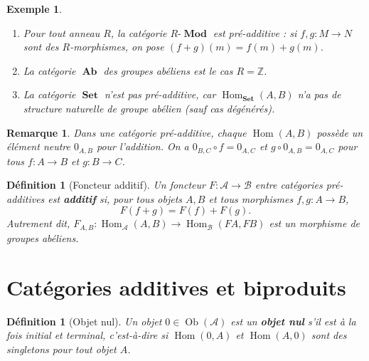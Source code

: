 \documentclass[a4paper,12pt]{book}
\DeclareMathOperator{\Hom}{Hom}
\DeclareMathOperator{\Ob}{Ob}
\DeclareMathOperator{\Set}{\mathbf{Set}}
\DeclareMathOperator{\Ab}{\mathbf{Ab}}
\DeclareMathOperator{\Mod}{\mathbf{Mod}}
\newcommand{\Z}{\mathbb{Z}}
\newtheorem{definition}[theoreme]{Définition}
\newtheorem{exemple}[theoreme]{Exemple}
\newtheorem*{remarque}{Remarque}
\begin{document}
\begin{exemple}\label{ex:preadditive}
\begin{enumerate}[label=(\roman*)]
\item Pour tout anneau $R$, la catégorie $R\text{-}\Mod$\index{R-Mod@$R\text{-}\Mod$}
  est pré-additive : si $f, g \colon M \to N$ sont des $R$-morphismes,
  on pose $(f + g)(m) = f(m) + g(m)$.

\item La catégorie $\Ab$\index{Ab@$\Ab$} des groupes abéliens
  est le cas $R = \Z$.

\item La catégorie $\Set$\index{Set@$\Set$} n'est \emph{pas}
  pré-additive, car $\Hom_{\Set}(A, B)$ n'a pas de structure naturelle
  de groupe abélien (sauf cas dégénérés).
\end{enumerate}
\end{exemple}

\begin{remarque}\label{rem:zero-morphism}
Dans une catégorie pré-additive, chaque $\Hom(A, B)$ possède un
élément neutre $0_{A,B}$ pour l'addition. On a
$0_{B,C} \circ f = 0_{A,C}$ et $g \circ 0_{A,B} = 0_{A,C}$
pour tous $f \colon A \to B$ et $g \colon B \to C$.
\end{remarque}

\begin{definition}[Foncteur additif]\label{def:additive-functor}
Un foncteur $F \colon \mathcal{A} \to \mathcal{B}$ entre catégories
pré-additives est \textbf{additif} si, pour tous objets $A, B$ et tous
morphismes $f, g \colon A \to B$,
\[
  F(f + g) = F(f) + F(g).
\]
Autrement dit, $F_{A,B} \colon \Hom_{\mathcal{A}}(A, B) \to
\Hom_{\mathcal{B}}(FA, FB)$ est un morphisme de groupes abéliens.
\end{definition}


\section{Catégories additives et biproduits}\label{sec:additive}

\begin{definition}[Objet nul]\label{def:zero-object}
Un objet $0 \in \Ob(\mathcal{A})$ est un \textbf{objet nul}
s'il est à la fois initial et terminal, c'est-à-dire si
$\Hom(0, A)$ et $\Hom(A, 0)$ sont des singletons pour tout objet $A$.
\end{definition}
\end{document}
